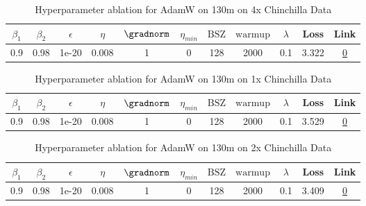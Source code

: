\begin{table}[H]
\centering
\caption{Hyperparameter ablation for AdamW on 130m on 4x Chinchilla Data}
\label{tab:ablation_adamw_130m_4}
\begin{tabular}{ccccccccccc}
\toprule
$\beta_1$ & $\beta_2$ & $\epsilon$ & $\eta$ & $\gradnorm$ & $\eta_{min}$ & $\mathrm{BSZ}$ & $\mathrm{warmup}$ & $\lambda$ & Loss & Link \\
\midrule
0.9 & 0.98 & 1e-20 & 0.008 & 1 & 0 & 128 & 2000 & 0.1 & 3.322 & \href{https://wandb.ai/stanford-mercury/optimizer-scaling/runs/sweep-130m-10B-adamw28a1ddlr0.008-wd0.1-minlr0-warmup2000-b10.9--a5a31c}{0} \\
\midrule
\bottomrule
\end{tabular}
\end{table}

\begin{table}[H]
\centering
\caption{Hyperparameter ablation for AdamW on 130m on 1x Chinchilla Data}
\label{tab:ablation_adamw_130m_1}
\begin{tabular}{ccccccccccc}
\toprule
$\beta_1$ & $\beta_2$ & $\epsilon$ & $\eta$ & $\gradnorm$ & $\eta_{min}$ & $\mathrm{BSZ}$ & $\mathrm{warmup}$ & $\lambda$ & Loss & Link \\
\midrule
0.9 & 0.98 & 1e-20 & 0.008 & 1 & 0 & 128 & 2000 & 0.1 & 3.529 & \href{https://wandb.ai/stanford-mercury/optimizer-scaling/runs/sweep-130m-2B-adamw5098e9lr0.008-wd0.1-minlr0-warmup2000-b10.9-b-bc5e36}{0} \\
\midrule
\bottomrule
\end{tabular}
\end{table}

\begin{table}[H]
\centering
\caption{Hyperparameter ablation for AdamW on 130m on 2x Chinchilla Data}
\label{tab:ablation_adamw_130m_2}
\begin{tabular}{ccccccccccc}
\toprule
$\beta_1$ & $\beta_2$ & $\epsilon$ & $\eta$ & $\gradnorm$ & $\eta_{min}$ & $\mathrm{BSZ}$ & $\mathrm{warmup}$ & $\lambda$ & Loss & Link \\
\midrule
0.9 & 0.98 & 1e-20 & 0.008 & 1 & 0 & 128 & 2000 & 0.1 & 3.409 & \href{https://wandb.ai/stanford-mercury/optimizer-scaling/runs/sweep-130m-5B-adamw90f5c1lr0.008-wd0.1-minlr0-warmup2000-b10.9-b-67adb6}{0} \\
\midrule
\bottomrule
\end{tabular}
\end{table}

